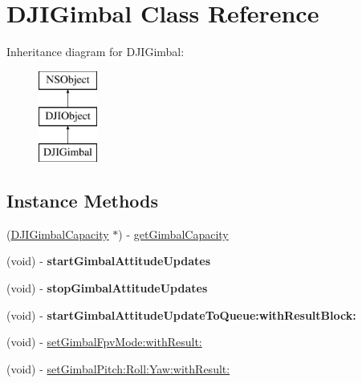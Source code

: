 \hypertarget{interface_d_j_i_gimbal}{\section{D\+J\+I\+Gimbal Class Reference}
\label{interface_d_j_i_gimbal}
}
Inheritance diagram for D\+J\+I\+Gimbal\+:\begin{figure}[H]
\begin{center}
\leavevmode
\includegraphics[height=3.000000cm]{interface_d_j_i_gimbal}
\end{center}
\end{figure}
\subsection*{Instance Methods}
\begin{DoxyCompactItemize}
\item 
(\hyperlink{interface_d_j_i_gimbal_capacity}{D\+J\+I\+Gimbal\+Capacity} $\ast$) -\/ \hyperlink{interface_d_j_i_gimbal_a38243bb650051f5529d0593a4a2fd6eb}{get\+Gimbal\+Capacity}
\item 
\hypertarget{interface_d_j_i_gimbal_addb61e4458e9f7532c1d7632e3256de8}{(void) -\/ {\bfseries start\+Gimbal\+Attitude\+Updates}}\label{interface_d_j_i_gimbal_addb61e4458e9f7532c1d7632e3256de8}

\item 
\hypertarget{interface_d_j_i_gimbal_ac787980c21cad6ef13094da82d08bcb3}{(void) -\/ {\bfseries stop\+Gimbal\+Attitude\+Updates}}\label{interface_d_j_i_gimbal_ac787980c21cad6ef13094da82d08bcb3}

\item 
\hypertarget{interface_d_j_i_gimbal_abd6ec35ba4e94a188d47bd6f40213837}{(void) -\/ {\bfseries start\+Gimbal\+Attitude\+Update\+To\+Queue\+:with\+Result\+Block\+:}}\label{interface_d_j_i_gimbal_abd6ec35ba4e94a188d47bd6f40213837}

\item 
(void) -\/ \hyperlink{interface_d_j_i_gimbal_a634e261178cf26f486ca4bb9e3fcc5b9}{set\+Gimbal\+Fpv\+Mode\+:with\+Result\+:}
\item 
(void) -\/ \hyperlink{interface_d_j_i_gimbal_ad420acf7e90595bce5504cc02dedeb01}{set\+Gimbal\+Pitch\+:\+Roll\+:\+Yaw\+:with\+Result\+:}
\end{DoxyCompactItemize}
